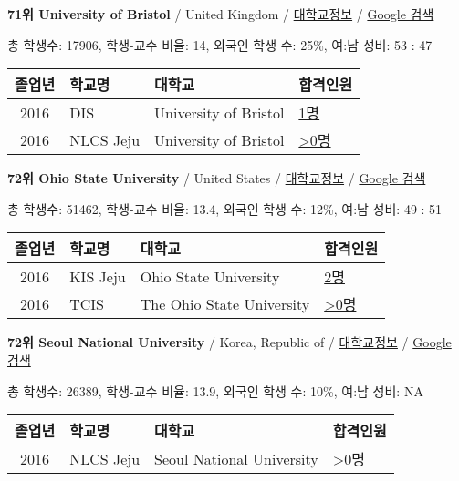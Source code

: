 \documentclass[13pt,]{article}
\begin{document}
\textbf{71위 University of Bristol} / United Kingdom /
\href{https://www.timeshighereducation.com/world-university-rankings/university-of-bristol?ranking-dataset=589595}{대학교정보}
/ \href{http://www.google.com/search?q=University+of+Bristol}{Google
검색}

총 학생수: 17906, 학생-교수 비율: 14, 외국인 학생 수: 25\%, 여:남 성비:
53 : 47

\begin{longtable}[]{@{}clll@{}}
\toprule
졸업년 & 학교명 & 대학교 & 합격인원\tabularnewline
\midrule
\endhead
2016 & DIS & University of Bristol &
\href{http://cafe.naver.com/assarabia/11591}{1명}\tabularnewline
2016 & NLCS Jeju & University of Bristol &
\href{http://cafe.naver.com/assarabia/11592}{\textgreater{}0명}\tabularnewline
\bottomrule
\end{longtable}

\textbf{72위 Ohio State University} / United States /
\href{https://www.timeshighereducation.com/world-university-rankings/ohio-state-university?ranking-dataset=589595}{대학교정보}
/ \href{http://www.google.com/search?q=Ohio+State+University}{Google
검색}

총 학생수: 51462, 학생-교수 비율: 13.4, 외국인 학생 수: 12\%, 여:남
성비: 49 : 51

\begin{longtable}[]{@{}clll@{}}
\toprule
졸업년 & 학교명 & 대학교 & 합격인원\tabularnewline
\midrule
\endhead
2016 & KIS Jeju & Ohio State University &
\href{http://cafe.naver.com/assarabia/11596}{2명}\tabularnewline
2016 & TCIS & The Ohio State University &
\href{http://cafe.naver.com/assarabia/11598}{\textgreater{}0명}\tabularnewline
\bottomrule
\end{longtable}

\textbf{72위 Seoul National University} / Korea, Republic of /
\href{https://www.timeshighereducation.com/world-university-rankings/seoul-national-university?ranking-dataset=589595}{대학교정보}
/ \href{http://www.google.com/search?q=Seoul+National+University}{Google
검색}

총 학생수: 26389, 학생-교수 비율: 13.9, 외국인 학생 수: 10\%, 여:남
성비: NA

\begin{longtable}[]{@{}clll@{}}
\toprule
졸업년 & 학교명 & 대학교 & 합격인원\tabularnewline
\midrule
\endhead
2016 & NLCS Jeju & Seoul National University &
\href{http://cafe.naver.com/assarabia/11592}{\textgreater{}0명}\tabularnewline
\bottomrule
\end{longtable}
\end{document}

